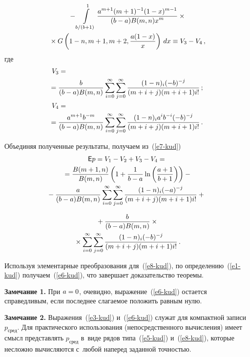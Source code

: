  \begin{multicols}{2}

\noindent
\begin{multline*}
{}- \int\limits_{b/(b+1)}^{1} \displaystyle\frac{\displaystyle a^{m+1}(m+1)^{-1} (1-x)^{m-1}\mathstrut}{\displaystyle (b - a) B(m,n)x^{m}\mathstrut}\times{}\\
{}\times
G\left(1-n,m+1,m+2, \displaystyle\frac{\displaystyle a(1 - x)\mathstrut}{\displaystyle x\mathstrut} \right)\,dx \equiv V_3-V_4\,,
\end{multline*}
где
\begin{align*}
V_3&= {}\\
&\hspace*{-5mm}{}=\fr{b}{(b - a)B(m,n)} \sum\limits_{i=0}^{\infty}\sum\limits_{j=0}^\infty
\fr{(1-n)_{i}(-b)^{-j}}{(m+i+j)(m+i+1)i! }\,;\\
V_4&= {}\\
&\hspace*{-5mm}{}=\fr{a^{m+1}b^{-m}}{(b - a)B(m,n)} \sum\limits_{i=0}^{\infty}\sum\limits_{j=0}^\infty
\fr{(1-n)_{i}a^{i}b^{-i}(-b)^{-j}}{(m+i+j)(m+i+1) i!}\,.
\end{align*}

Объединяя полученные результаты, получаем из~(\ref{e7-kud})
\begin{multline*}
{\sf E} p=V_1-V_2+V_3-V_4= {}\\
{}=\displaystyle\frac{\displaystyle B(m + 1, n)\mathstrut}{\displaystyle B(m,n)\mathstrut} \left(
1 + \displaystyle\frac{\displaystyle 1\mathstrut}{\displaystyle b-a\mathstrut} \ln \left( \displaystyle\frac{\displaystyle a+1\mathstrut}{\displaystyle b+1\mathstrut}\right)  \right)-{}\\
\!\!{}- \displaystyle\frac{\displaystyle a\mathstrut}{\displaystyle (b - a)B(m,n)\mathstrut} \sum\limits_{i=0}^{\infty}\sum\limits_{j=0}^\infty
\displaystyle\frac{\displaystyle  (1-n)_{i}(-a)^{-j}\mathstrut}{\displaystyle (m+i+j)(m+i+1) i! \mathstrut}+{}
\end{multline*}

\noindent
\begin{multline}
{}+ \displaystyle\frac{\displaystyle b\mathstrut}{\displaystyle (b - a)B(m,n)\mathstrut} \times{}\\
{}\times \sum\limits_{i=0}^{\infty}\sum\limits_{j=0}^\infty
\displaystyle\frac{\displaystyle (1-n)_{i}(-b)^{-j}\mathstrut}{\displaystyle (m+i+j)(m+i+1) i! \mathstrut}\,.\label{e8-kud}
\end{multline}

Используя элементарные преобразования для~(\ref{e8-kud}), по определению~(\ref{e1-kud})
получаем~(\ref{e6-kud}), что завершает доказательство теоремы.

\smallskip

\noindent
\textbf{Замечание 1.} При $a\hm=0$, очевидно, выражение~(\ref{e6-kud}) остается
справедливым, если последнее слагаемое положить равным нулю.

\smallskip

\noindent
\textbf{Замечание 2.} Выражения~(\ref{e3-kud}) и~(\ref{e6-kud}) служат для компактной
записи $p_{\mathrm{сред}}$. Для практического использования
(непосредственного вычисления) имеет смысл представлять
$p_{\mathrm{сред}}$ в~виде рядов типа~(\ref{e5-kud}) и~(\ref{e8-kud}), которые
несложно вычисляются с~любой наперед заданной точностью.


\end{multicols}
